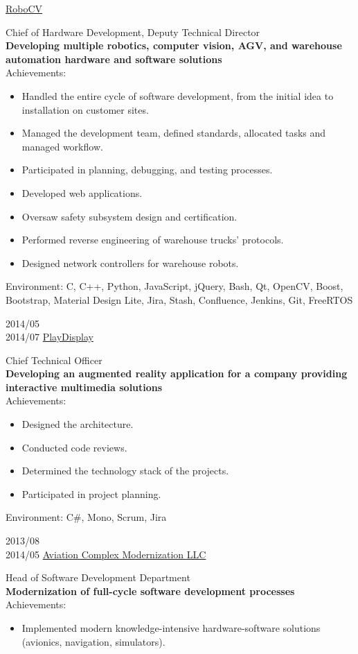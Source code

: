 \begin{entrylist}
{\href{https://robocv.com}{RoboCV}}
{}
{Chief of Hardware Development, Deputy Technical Director\\
\textbf{Developing multiple robotics, computer vision, AGV, and warehouse automation hardware and software solutions}\\
Achievements:
\begin{itemize}
\item Handled the entire cycle of software development, from the initial idea to installation on customer sites.
\item Managed the development team, defined standards, allocated tasks and managed workflow.
\item Participated in planning, debugging, and testing processes.
\item Developed web applications.
\item Oversaw safety subsystem design and certification.
\item Performed reverse engineering of warehouse trucks' protocols.
\item Designed network controllers for warehouse robots.
\end{itemize}
Environment: C, C++, Python, JavaScript, jQuery, Bash, Qt, OpenCV, Boost, Bootstrap, Material Design Lite, Jira, Stash, Confluence, Jenkins, Git, FreeRTOS}
\entry
{2014/05\\2014/07}
{\href{https://playdisplay.com}{PlayDisplay}}
{}
{Chief Technical Officer\\
\textbf{Developing an augmented reality application for a company providing interactive multimedia solutions}\\
Achievements:
\begin{itemize}
\item Designed the architecture.
\item Conducted code reviews.
\item Determined the technology stack of the projects.
\item Participated in project planning.
\end{itemize}
Environment: C\#, Mono, Scrum, Jira}
\entry
{2013/08\\2014/05}
{\href{}{Aviation Complex Modernization LLC}}
{}
{Head of Software Development Department\\
\textbf{Modernization of full-cycle software development processes}\\
Achievements:
\begin{itemize}
\item Implemented modern knowledge-intensive hardware-software solutions (avionics, navigation, simulators).

\end{itemize}}
\end{entrylist}
